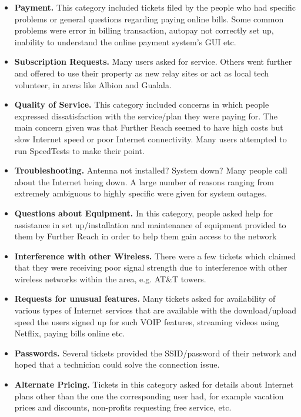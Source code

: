 \begin{itemize}
\item \textbf{Payment.} This category included tickets filed by the people who had specific problems or general questions regarding paying online bills. Some common problems were error in billing transaction, autopay not correctly set up, inability to understand the online payment system’s GUI etc.
\item \textbf{Subscription Requests.} Many users asked for service. Others
went further and offered to use their property as new relay
  sites or act as local tech volunteer, in areas like Albion and Gualala. %
\item \textbf{Quality of Service.} This category included concerns in which people expressed dissatisfaction with the service/plan they were paying for.
The main concern given was that Further Reach seemed to have high costs but slow Internet speed or poor Internet
connectivity. Many users attempted to run SpeedTests to make their point.
\item \textbf{Troubleshooting.} Antenna not installed? System down? Many people call
  about the Internet being down. A large number of reasons ranging from extremely ambiguous to highly specific were given for system outages.
\item \textbf{Questions about Equipment.} In this category, people asked help for assistance in set up/installation and maintenance of equipment provided to them by Further Reach in order to help them gain access to the network
\item \textbf{Interference with other Wireless.} There were a few tickets which claimed
that they were receiving poor signal strength due to interference with other
wireless networks within the area, e.g. AT\&T towers.
\item \textbf{Requests for unusual features.} Many tickets asked for availability of various types of Internet services that are available with the download/upload speed the users signed up for such VOIP features, streaming videos using Netflix, paying bills online etc.
\item \textbf{Passwords.} Several tickets provided the SSID/password of their
network and hoped that a technician could solve the connection issue.
\item \textbf{Alternate Pricing.} Tickets in this category asked for details about
Internet plans other than the one the corresponding user had, for example
vacation prices and discounts, non-profits requesting free service, etc.
\end{itemize}

